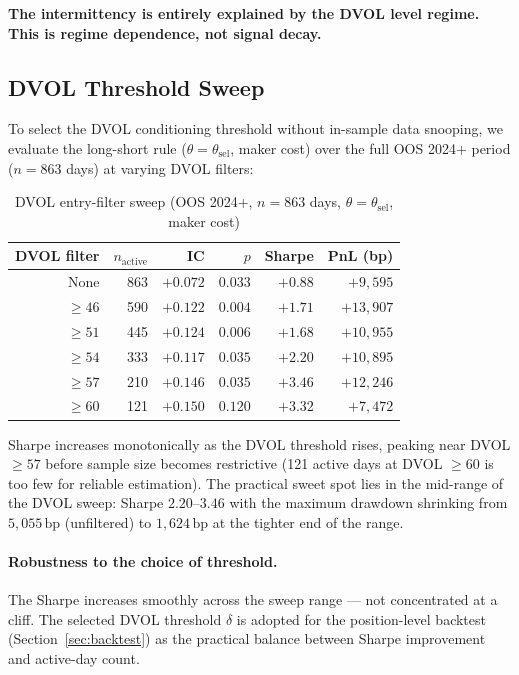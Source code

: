 \documentclass[12pt, a4paper]{article}
\theoremstyle{plain}
\theoremstyle{definition}
\newcommand{\bp}{\,\mathrm{bp}}
\begin{document}
\textbf{The intermittency is entirely explained by the DVOL level regime.
This is regime dependence, not signal decay.}

\subsection{DVOL Threshold Sweep}
\label{sec:threshold_sweep}

To select the DVOL conditioning threshold without in-sample data snooping,
we evaluate the long-short rule ($\theta = \theta_\mathrm{sel}$, maker cost) over the full
OOS 2024+ period ($n = 863$ days) at varying DVOL filters:

\begin{table}[H]
\centering
\caption{DVOL entry-filter sweep (OOS 2024+, $n=863$ days, $\theta=\theta_\mathrm{sel}$, maker cost)}
\label{tab:dvol_sweep}
\begin{tabular}{rrrrrr}
\toprule
DVOL filter & $n_{\text{active}}$ & IC & $p$ & Sharpe & PnL (bp) \\
\midrule
None       & 863 & $+0.072$ & $0.033$ & $+0.88$ & $+9{,}595$  \\
$\geq 46$  & 590 & $+0.122$ & $0.004$ & $+1.71$ & $+13{,}907$ \\
$\geq 51$  & 445 & $+0.124$ & $0.006$ & $+1.68$ & $+10{,}955$ \\
$\geq 54$  & 333 & $+0.117$ & $0.035$ & $+2.20$ & $+10{,}895$ \\
$\geq 57$  & 210 & $+0.146$ & $0.035$ & $+\mathbf{3.46}$ & $+12{,}246$ \\
$\geq 60$  & 121 & $+0.150$ & $0.120$ & $+3.32$ & $+7{,}472$  \\
\bottomrule
\end{tabular}
\end{table}

Sharpe increases monotonically as the DVOL threshold rises, peaking near
DVOL $\geq 57$ before sample size becomes restrictive (121 active days
at DVOL $\geq 60$ is too few for reliable estimation). The practical sweet
spot lies in the mid-range of the DVOL sweep: Sharpe $2.20$--$3.46$ with
the maximum drawdown shrinking from $5{,}055\bp$ (unfiltered) to $1{,}624\bp$
at the tighter end of the range.

\paragraph{Robustness to the choice of threshold.}
The Sharpe increases smoothly across the sweep range — not concentrated at a
cliff. The selected DVOL threshold $\delta$ is adopted for the
position-level backtest (Section~\ref{sec:backtest}) as the practical
balance between Sharpe improvement and active-day count.
\end{document}
